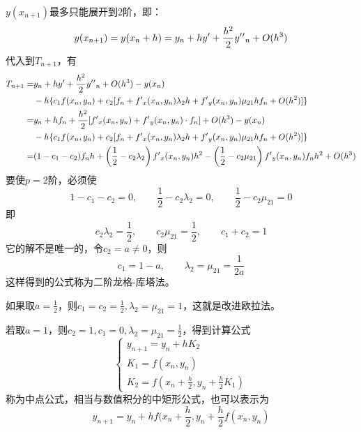 $y(x_{n+1})$最多只能展开到2阶，即：
\begin{align*}
y(x_{n+1}) = y(x_n+h)=y_n+hy\rq{}+\frac{h^2}{2}y\rq{}\rq{}_n+O(h^3)
\end{align*}
代入到$T_{n+1}$，有
\begin{align*}
T_{n+1}=&y_n+hy\rq{}+\frac{h^2}{2}y\rq{}\rq{}_n+O(h^3)-y(x_n)\\
&-h\{c_1f(x_n,y_n)
+c_2[f_n+f\rq{}_x(x_n,y_n)\lambda_2h+f\rq{}_y(x_n,y_n)\mu_{21}hf_n+O(h^2)]\}\\
=&y_n+hf_n+\frac{h^2}{2}[f\rq{}_x(x_n,y_n)+f\rq{}_y(x_n,y_n)\cdot f_n]+O(h^3)-y(x_n)\\
&-h\{c_1f(x_n,y_n)
+c_2[f_n+f\rq{}_x(x_n,y_n)\lambda_2h+f\rq{}_y(x_n,y_n)\mu_{21}hf_n+O(h^2)]\}\\
=&(1-c_1-c_2)f_nh+\left(\frac{1}{2}-c_2\lambda_2\right)f\rq{}_x(x_n,y_n)h^2-\left(\frac{1}{2}-c_2\mu_{21}\right)f\rq{}_y(x_n,y_n)f_nh^2+O(h^3)
\end{align*}
要使$p=2$阶，必须使
$$1-c_1-c_2=0,\qquad \frac{1}{2}-c_2\lambda_2=0,\qquad \frac{1}{2}-c_2\mu_{21}=0$$
即
$$c_2\lambda_2=\frac{1}{2} ,\qquad c_2\mu_{21}=\frac{1}{2} ,\qquad c_1+c_2=1$$
它的解不是唯一的，令$c_2=a\ne 0$，则
$$c_1=1-a ,\qquad \lambda_2=\mu_{21}=\frac{1}{2a} $$
这样得到的公式称为二阶龙格-库塔法。

如果取$a=\frac{1}{2}$，则$c_1=c_2=\frac{1}{2} ,\lambda_2=\mu_{21}=1$，这就是改进欧拉法。

若取$a=1$，则$c_2=1,c_1=0,\lambda_2=\mu_{21}=\frac{1}{2}$，得到计算公式
$$\begin{cases}
y_{n+1}=y_n+hK_2\\
K_1=f(x_n,y_n)\\
K_2=f(x_n+\frac{h}{2},y_n+\frac{h}{2}K_1)
\end{cases}$$
称为中点公式，相当与数值积分的中矩形公式，也可以表示为
$$y_{n+1}=y_n+hf(x_n+\frac{h}{2},y_n+\frac{h}{2}f(x_n,y_n)$$



